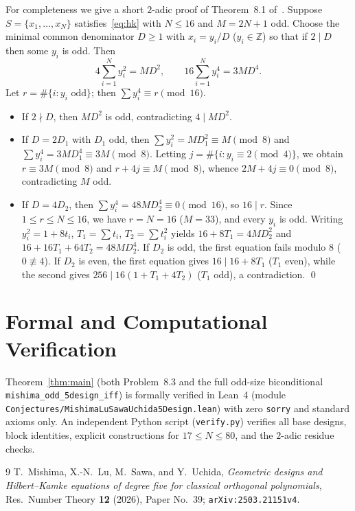 \documentclass[11pt]{article}
\begin{document}
For completeness we give a short $2$-adic proof of Theorem~8.1
of~\cite{MLSU2026}. Suppose $S = \{x_1, \dots, x_N\}$ satisfies~\eqref{eq:hk}
with $N \le 16$ and $M = 2N + 1$ odd. Choose the minimal common denominator
$D \ge 1$ with $x_i = y_i / D$ ($y_i \in \mathbb{Z}$) so that if $2 \mid D$ then
some $y_i$ is odd. Then
\[
4\sum_{i=1}^N y_i^2 = M D^2, \qquad 16\sum_{i=1}^N y_i^4 = 3 M D^4.
\]
Let $r = \#\{i : y_i \text{ odd}\}$; then $\sum y_i^4 \equiv r \pmod{16}$.
\begin{itemize}
\item If $2 \nmid D$, then $M D^2$ is odd, contradicting $4 \mid M D^2$.
\item If $D = 2 D_1$ with $D_1$ odd, then $\sum y_i^2 = M D_1^2 \equiv M \pmod 8$
and $\sum y_i^4 = 3 M D_1^4 \equiv 3M \pmod 8$. Letting $j = \#\{i : y_i \equiv 2 \pmod 4\}$,
we obtain $r \equiv 3M \pmod 8$ and $r + 4j \equiv M \pmod 8$, whence
$2M + 4j \equiv 0 \pmod 8$, contradicting $M$ odd.
\item If $D = 4 D_2$, then $\sum y_i^4 = 48 M D_2^4 \equiv 0 \pmod{16}$, so
$16 \mid r$. Since $1 \le r \le N \le 16$, we have $r = N = 16$ ($M = 33$), and
every $y_i$ is odd. Writing $y_i^2 = 1 + 8 t_i$, $T_1 = \sum t_i$,
$T_2 = \sum t_i^2$ yields $16 + 8 T_1 = 4 M D_2^2$ and
$16 + 16 T_1 + 64 T_2 = 48 M D_2^4$. If $D_2$ is odd, the first equation fails
modulo $8$ ($0 \not\equiv 4$). If $D_2$ is even, the first equation gives
$16 \mid 16 + 8 T_1$ ($T_1$ even), while the second gives
$256 \mid 16(1 + T_1 + 4 T_2)$ ($T_1$ odd), a contradiction. \qed
\end{itemize}

\section{Formal and Computational Verification}

Theorem~\ref{thm:main} (both Problem~8.3 and the full odd-size biconditional
\texttt{mishima\_odd\_\allowbreak 5design\_iff}) is formally verified in Lean~4
(module \texttt{Conjectures/\allowbreak MishimaLuSawaUchida5Design.lean}) with
zero \texttt{sorry} and standard axioms only. An independent Python script
(\texttt{verify.py}) verifies all base designs, block identities, explicit
constructions for $17 \le N \le 80$, and the $2$-adic residue checks.

\begin{thebibliography}{9}
T.~Mishima, X.-N.~Lu, M.~Sawa, and Y.~Uchida,
\emph{Geometric designs and Hilbert--Kamke equations of degree five for
classical orthogonal polynomials},
Res.\ Number Theory \textbf{12} (2026), Paper No.~39;
\texttt{arXiv:2503.21151v4}.
\end{thebibliography}
\end{document}
